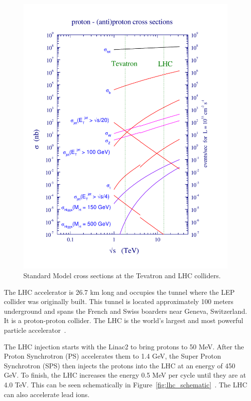 \begin{figure}[htb]                                                               
\begin{center}
\includegraphics[width=0.99\textwidth]{Experiment/lhcolor.pdf}
\end{center}
\vspace*{-1cm}
\caption{Standard Model cross sections at the Tevatron
and LHC colliders.~\cite{Campbell:2006wx}}
\label{fig:lhcall}                    
\end{figure} 



The LHC accelerator is 26.7 km long and occupies the tunnel where the LEP collider was originally built.  This tunnel is located approximately 100 meters underground and spans the French and Swiss boarders near Geneva, Switzerland.  It is a proton-proton collider. The LHC is the world's largest and most powerful particle accelerator~\cite{LHCDesignReport}.

The LHC injection starts with the Linac2 to bring protons to 50 MeV.  After the Proton Synchrotron (PS) accelerates them to 1.4 GeV, the Super Proton Synchrotron (SPS) then injects the protons into the LHC at an energy of 450 GeV.  To finish, the LHC increases the energy 0.5 MeV per cycle until they are at 4.0 TeV.  This can be seen schematically in Figure~\ref{fig:lhc_schematic}~\cite{CERN_complex}. The LHC can also accelerate lead ions.

